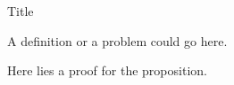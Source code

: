 \documentclass{article}
\begin{document}
\begin{e}{Title}

    \begin{pb}

        A definition or a problem could go here.

    \end{pb}

    \begin{pf}
        
        Here lies a proof for the proposition.

    \end{pf}

\end{e}
\end{document}
